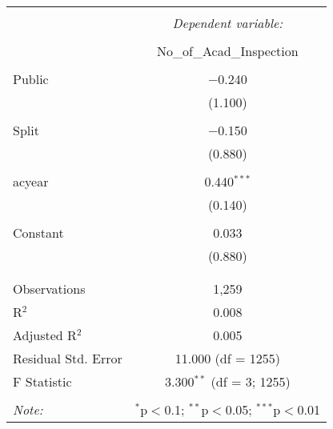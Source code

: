 \documentclass[12pt, a4paper]{article}
\begin{document}
\begin{table}[!htbp] \centering 
  \caption{} 
  \label{} 
\begin{tabular}{@{\extracolsep{5pt}}lc} 
\\[-1.8ex]\hline 
\hline \\[-1.8ex] 
 & \multicolumn{1}{c}{\textit{Dependent variable:}} \\ 
\cline{2-2} 
\\[-1.8ex] & No\_of\_Acad\_Inspection \\ 
\hline \\[-1.8ex] 
 Public & $-$0.240 \\ 
  & (1.100) \\ 
  & \\ 
 Split & $-$0.150 \\ 
  & (0.880) \\ 
  & \\ 
 acyear & 0.440$^{***}$ \\ 
  & (0.140) \\ 
  & \\ 
 Constant & 0.033 \\ 
  & (0.880) \\ 
  & \\ 
\hline \\[-1.8ex] 
Observations & 1,259 \\ 
R$^{2}$ & 0.008 \\ 
Adjusted R$^{2}$ & 0.005 \\ 
Residual Std. Error & 11.000 (df = 1255) \\ 
F Statistic & 3.300$^{**}$ (df = 3; 1255) \\ 
\hline 
\hline \\[-1.8ex] 
\textit{Note:}  & \multicolumn{1}{r}{$^{*}$p$<$0.1; $^{**}$p$<$0.05; $^{***}$p$<$0.01} \\ 
\end{tabular} 
\end{table} 	\printbibliography
\end{document}
